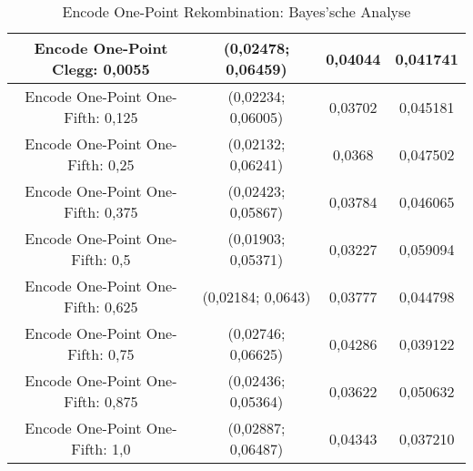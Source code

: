 \begin{table}[H]
\begin{tabular}{c | c | c | c}
		\hline
		Encode One-Point Clegg: 0,0055 & (0,02478; 0,06459) & 0,04044 & 0,041741\\
		\hline
		\hline
		Encode One-Point One-Fifth: 0,125 & (0,02234; 0,06005) & 0,03702 & 0,045181\\
		\hline
		Encode One-Point One-Fifth: 0,25 & (0,02132; 0,06241) & 0,0368 & 0,047502\\
		\hline
		Encode One-Point One-Fifth: 0,375 & \color{Green}(0,02423; 0,05867)\color{black} & 0,03784 & 0,046065\\
		\hline
		Encode One-Point One-Fifth: 0,5 & (0,01903; 0,05371) & \color{Green}0,03227\color{black} & \color{Green}0,059094\color{black}\\
		\hline
		Encode One-Point One-Fifth: 0,625 & \color{red}(0,02184; 0,0643)\color{black} & 0,03777 & 0,044798\\
		\hline
		Encode One-Point One-Fifth: 0,75 & (0,02746; 0,06625) & 0,04286 & 0,039122\\
		\hline
		Encode One-Point One-Fifth: 0,875 & \color{Green}(0,02436; 0,05364)\color{black} & 0,03622 & 0,050632\\
		\hline
		Encode One-Point One-Fifth: 1,0 & (0,02887; 0,06487) & 0,04343 & \color{red}0,037210\color{black}\\
	\end{tabular}
	\caption{Encode One-Point Rekombination: Bayes'sche Analyse}
	\label{table:encodeOnePointBayesian}
\end{table}

